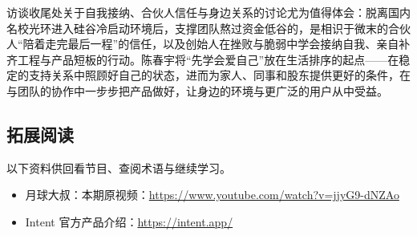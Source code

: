 \documentclass[UTF8,a4paper,11pt,fontset=fandol]{ctexart}
\begin{document}
访谈收尾处关于自我接纳、合伙人信任与身边关系的讨论尤为值得体会：脱离国内名校光环进入硅谷冷启动环境后，支撑团队熬过资金低谷的，是相识于微末的合伙人“陪着走完最后一程”的信任，以及创始人在挫败与脆弱中学会接纳自我、亲自补齐工程与产品短板的行动。陈春宇将“先学会爱自己”放在生活排序的起点——在稳定的支持关系中照顾好自己的状态，进而为家人、同事和股东提供更好的条件，在与团队的协作中一步步把产品做好，让身边的环境与更广泛的用户从中受益。
\subsection{拓展阅读}
以下资料供回看节目、查阅术语与继续学习。
\begin{itemize}
\item 月球大叔：本期原视频：\url{https://www.youtube.com/watch?v=jjyG9-dNZAo}
\item Intent 官方产品介绍：\url{https://intent.app/}
\end{itemize}
\end{document}
